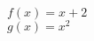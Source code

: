 \documentclass[varwidth,convert={density=2000,size=2000x,outext=.png}]{standalone}
\begin{document}
$f(x)=x+2$
\\
$g(x)=x^2$
\end{document}

